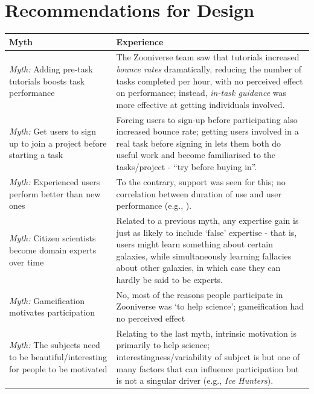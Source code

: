 \documentclass{sigchi}
\begin{document}

\section{Recommendations for Design}

\begin{table}
\begin{center}
\begin{tabular}{p{4.5cm}p{13cm}}
Myth & Experience \\
\hline
\emph{Myth:} Adding pre-task tutorials boosts task performance & The Zooniverse team saw that tutorials increased \emph{bounce rates} dramatically, reducing the number of tasks completed per hour, with no perceived effect on performance; instead, \emph{in-task guidance} was more effective at getting individuals involved. \\
\hline
\emph{Myth:} Get users to sign up to join a project before starting a task & Forcing users to sign-up before participating also increased bounce rate; getting users involved in a real task before signing in lets them both do useful work and become familiarised to the tasks/project - ``try before buying in''. \\
\hline
\emph{Myth:} Experienced users perform better than new ones &  To the contrary, support was seen for this; no correlation between duration of use and user performance (e.g., \cite{simpson2013dynamic}). \\
\hline
\emph{Myth:} Citizen scientists become domain experts over time &  Related to a previous myth, any expertise gain is just as likely to include `false' expertise - that is, users might learn something about certain galaxies, while simultaneously learning fallacies about other galaxies, in which case they can hardly be said to be experts. \\
\hline
\emph{Myth:} Gameification motivates participation &  No, most of the reasons people participate in Zooniverse was `to help science'; gameification had no perceived effect \\
\hline
\emph{Myth:} The subjects need to be beautiful/interesting for people to be motivated & Relating to the last myth, intrinsic motivation is primarily to help science; interestingness/variability of subject is but one of many factors that can influence participation but is not a singular driver (e.g., \emph{Ice Hunters}). \\

\end{tabular}
\end{center}
\end{table}
\end{document}

